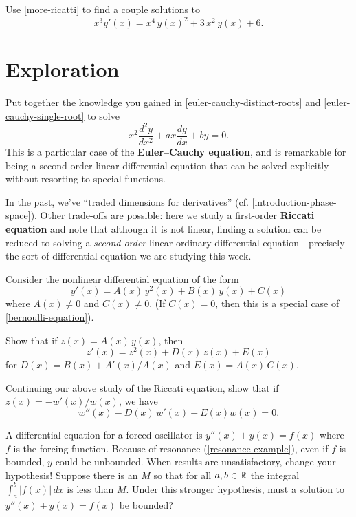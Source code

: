\documentclass{homework}
\begin{document}
\begin{problem}Use \ref{more-ricatti} to find a couple solutions to
  \[
    x^3 y'(x) = x^4 \, y(x)^2 + 3 \, x^2 \, y(x) + 6.
  \]
\end{problem}

\section{Exploration}

\begin{problem}\label{second-order-euler-cauchy}Put together the knowledge you gained in \ref{euler-cauchy-distinct-roots} and \ref{euler-cauchy-single-root} to solve
  \[
    x^{2}{\frac {d^{2}y}{dx^{2}}}+ax{\frac {dy}{dx}}+by=0.
  \]
  This is a particular case of the \textbf{Euler--Cauchy equation},
  and is remarkable for being a second order linear differential
  equation that can be solved explicitly without resorting to special
  functions.
\end{problem}

\begin{problem}\label{riccati-equation}In the past, we've ``traded dimensions for derivatives'' (cf. \ref{introduction-phase-space}).  Other trade-offs are
  possible: here we study a first-order \textbf{Riccati equation} and
  note that although it is not linear, finding a solution can be
  reduced to solving a \textit{second-order} linear ordinary
  differential equation---precisely the sort of differential equation
  we are studying this week.

  Consider the nonlinear differential equation of the form
  \[
    y'(x)=A(x)\,y^{2}(x) + B(x)\,y(x) + C(x)
  \]
  where $A(x) \neq 0$ and $C(x) \neq 0$.  (If $C(x) = 0$, then this is
  a special case of \ref{bernoulli-equation}).

  Show that if $z(x) = A(x) \, y(x)$, then
  \[
    z'(x)=z^{2}(x) + D(x)\,z(x) + E(x)
  \]
  for $D(x) = B(x) + A'(x)/A(x)$ and $E(x) = A(x) \, C(x)$.
\end{problem}
  
\begin{problem}\label{more-ricatti}Continuing our above study of the Riccati equation,
  show that if $z(x) = -w'(x)/w(x)$, we have
  \[
    w''(x) - D(x) \, w'(x) + E(x) w(x) = 0.
  \]
\end{problem}

\begin{problem}
  A differential equation for a forced oscillator is
  $y''(x) + y(x) = f(x)$ where $f$ is the forcing function.  Because
  of resonance (\ref{resonance-example}), even if $f$ is bounded, $y$
  could be unbounded.  When results are unsatisfactory, change your
  hypothesis!  Suppose there is an $M$ so that for all $a, b \in \mathbb{R}$
  the integral $\int_a^b \left|f(x)\right| \, dx$ is less than $M$.
  Under this stronger hypothesis, must a solution to
  $y''(x) + y(x) = f(x)$ be bounded?
\end{problem}
\end{document}
